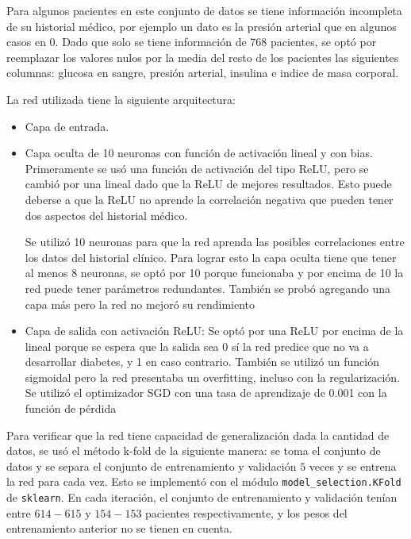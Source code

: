     Para algunos pacientes en este conjunto de datos se tiene información incompleta de su historial médico, por ejemplo un dato es la presión arterial que en algunos casos en 0. Dado que solo se tiene información de 768 pacientes, se optó por reemplazar los valores nulos por la media del resto de los pacientes las siguientes columnas: glucosa en sangre, presión arterial, insulina e indice de masa corporal.


    La red utilizada tiene la siguiente arquitectura:

    \begin{itemize}
        \item Capa de entrada.
        \item Capa oculta de 10 neuronas con función de activación lineal y con bias.
        Primeramente se usó una función de activación del tipo ReLU, pero se cambió por una lineal dado que la ReLU de mejores resultados. Esto puede  deberse a que la ReLU no aprende la correlación negativa que pueden tener dos aspectos del historial médico.  

        Se utilizó 10 neuronas para que la red aprenda las posibles correlaciones entre los datos del historial clínico. Para lograr esto la capa oculta tiene que tener al menos 8 neuronas, se optó por 10 porque funcionaba y por encima de 10 la red puede tener parámetros redundantes. También se probó agregando una capa más pero la red no mejoró su rendimiento

        \item Capa de salida con activación ReLU: Se optó por una ReLU por encima de la lineal porque se espera que la salida sea 0 sí la red predice que no va a desarrollar diabetes, y 1 en caso contrario. También se utilizó un función sigmoidal pero la red presentaba un overfitting, incluso con la regularización. Se utilizó el optimizador SGD con una tasa de aprendizaje de 0.001 con la función de pérdida  
    \end{itemize}

    Para verificar que la red tiene capacidad de generalización dada la cantidad de datos, se usó el método k-fold de la siguiente manera: se toma el conjunto de datos y se separa el conjunto de entrenamiento y validación $5$ veces y se entrena la red para cada vez. Esto se implementó con el módulo \verb|model_selection.KFold| de  \verb|sklearn|. En cada iteración, el conjunto de entrenamiento y validación tenían entre $614-615$ y $154-153$ pacientes respectivamente, y los pesos del entrenamiento anterior no se tienen en cuenta. 

